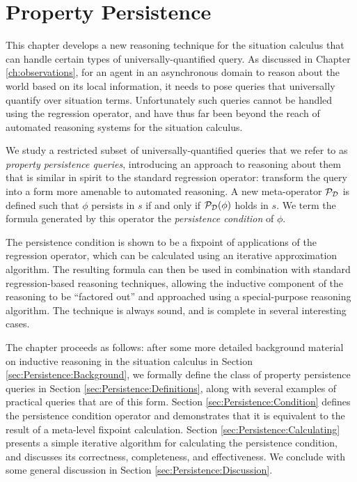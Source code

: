 

\chapter{Property Persistence}

\label{ch:persistence}

This chapter develops a new reasoning technique for the situation
calculus that can handle certain types of universally-quantified query.
As discussed in Chapter \ref{ch:observations}, for an agent in an
asynchronous domain to reason about the world based on its local information,
it needs to pose queries that universally quantify over situation
terms. Unfortunately such queries cannot be handled using the regression
operator, and have thus far been beyond the reach of automated reasoning
systems for the situation calculus.

We study a restricted subset of universally-quantified queries that
we refer to as \emph{property persistence queries}, introducing an
approach to reasoning about them that is similar in spirit to the
standard regression operator: transform the query into a form more
amenable to automated reasoning. A new meta-operator $\mathcal{P}_{\mathcal{D}}$
is defined such that $\phi$ persists in $s$ if and only if $\mathcal{P}_{\mathcal{D}}(\phi)$
holds in $s$. We term the formula generated by this operator the
\emph{persistence condition} of $\phi$.

The persistence condition is shown to be a fixpoint of applications
of the regression operator, which can be calculated using an iterative
approximation algorithm. The resulting formula can then be used in
combination with standard regression-based reasoning techniques, allowing
the inductive component of the reasoning to be {}``factored out''
and approached using a special-purpose reasoning algorithm. The technique
is always sound, and is complete in several interesting cases.

The chapter proceeds as follows: after some more detailed background
material on inductive reasoning in the situation calculus in Section
\ref{sec:Persistence:Background}, we formally define the class of
property persistence queries in Section \ref{sec:Persistence:Definitions},
along with several examples of practical queries that are of this
form. Section \ref{sec:Persistence:Condition} defines the persistence
condition operator and demonstrates that it is equivalent to the result
of a meta-level fixpoint calculation. Section \ref{sec:Persistence:Calculating}
presents a simple iterative algorithm for calculating the persistence
condition, and discusses its correctness, completeness, and effectiveness.
We conclude with some general discussion in Section \ref{sec:Persistence:Discussion}.

